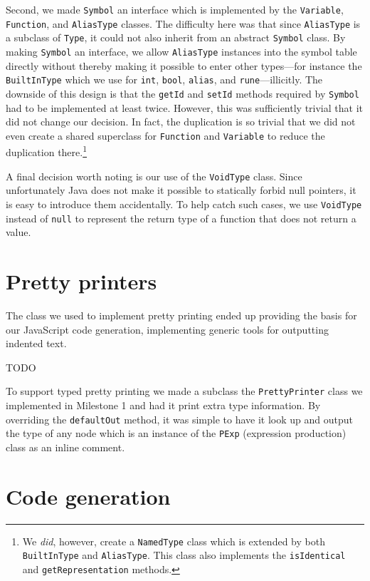 \documentclass[oneside]{article}
\begin{document}
Second, we made \texttt{Symbol} an interface which is implemented by the \texttt{Variable}, \texttt{Function}, and \texttt{AliasType} classes. The difficulty here was that since \texttt{AliasType} is a subclass of \texttt{Type}, it could not also inherit from an abstract \texttt{Symbol} class. By making \texttt{Symbol} an interface, we allow \texttt{AliasType} instances into the symbol table directly without thereby making it possible to enter other types---for instance the \texttt{BuiltInType} which we use for \texttt{int}, \texttt{bool}, \texttt{alias}, and \texttt{rune}---illicitly. The downside of this design is that the \texttt{getId} and \texttt{setId} methods required by \texttt{Symbol} had to be implemented at least twice. However, this was sufficiently trivial that it did not change our decision. In fact, the duplication is so trivial that we did not even create a shared superclass for \texttt{Function} and \texttt{Variable} to reduce the duplication there.\footnote{We \emph{did}, however, create a \texttt{NamedType} class which is extended by both \texttt{BuiltInType} and \texttt{AliasType}. This class also implements the \texttt{isIdentical} and \texttt{getRepresentation} methods.}

A final decision worth noting is our use of the \texttt{VoidType} class. Since unfortunately Java does not make it possible to statically forbid null pointers, it is easy to introduce them accidentally. To help catch such cases, we use \texttt{VoidType} instead of \texttt{null} to represent the return type of a function that does not return a value.

\section{Pretty printers}
The class we used to implement pretty printing ended up providing the basis for our JavaScript code generation, implementing generic tools for outputting indented text.

TODO

To support typed pretty printing we made a subclass the \verb|PrettyPrinter| class we implemented in Milestone 1 and had it print extra type information. By overriding the \verb|defaultOut| method, it was simple to have it look up and output the type of any node which is an instance of the \verb|PExp| (expression production) class as an inline comment.

\section{Code generation}
\end{document}
